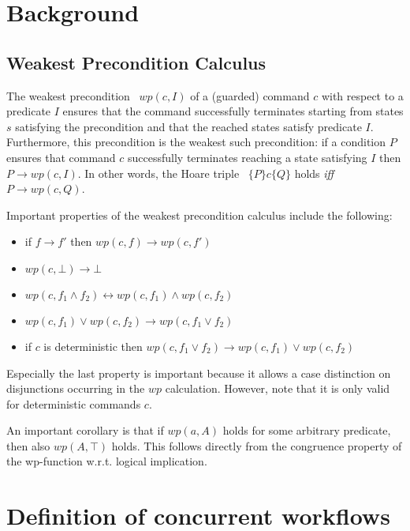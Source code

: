 \documentclass[11pt]{article}
\begin{document}
\section{Background}

\subsection{Weakest Precondition Calculus}
\label{ssec:wp_calc}

The weakest precondition~\cite{Dijkstra1976} $wp(c,I)$ of a (guarded) command $c$ with respect to a predicate $I$ ensures that the command successfully terminates starting from states $s$ satisfying the precondition and that the reached states satisfy predicate $I$. Furthermore, this precondition is the weakest such precondition: if a condition $P$ ensures that command $c$ successfully terminates reaching a state satisfying $I$ then $P \longrightarrow wp(c,I)$. In other words, the Hoare triple~\cite{Hoare1969} $\{P\} c \{Q\}$ holds \textit{iff} $P \longrightarrow wp(c,Q)$.

Important properties of the weakest precondition calculus include the following:

\begin{itemize}
  \item if $f \longrightarrow f'$ then $wp(c,f) \longrightarrow wp(c,f')$
  \item $wp(c,\bot) \longrightarrow \bot$
  \item $wp(c,f_1 \land f_2) \longleftrightarrow wp(c,f_1) \land wp(c,f_2)$
  \item $wp(c,f_1) \lor wp(c,f_2) \longrightarrow wp(c,f_1 \lor f_2)$
  \item if $c$ is deterministic then $wp(c,f_1 \lor f_2) \longrightarrow wp(c,f_1) \lor wp(c,f_2)$
\end{itemize}

Especially the last property is important because it allows a case distinction on disjunctions occurring in the $wp$ calculation. However, note that it is only valid for deterministic commands $c$.

An important corollary is that if $wp(a,A)$ holds for some arbitrary predicate, then also $wp(A,\top)$ holds. This follows directly from the congruence property of the wp-function w.r.t. logical implication.


\section{Definition of concurrent workflows}
\end{document}
